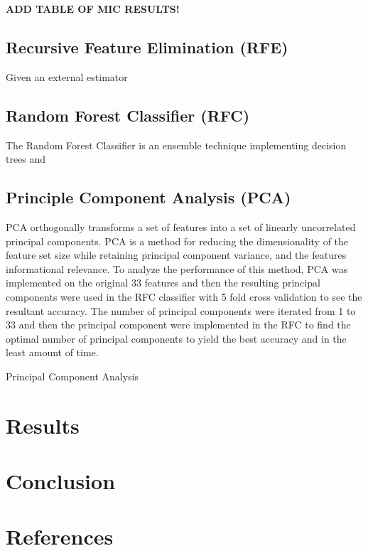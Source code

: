 \documentclass{article}
\begin{document}
\textbf{\color{red}ADD TABLE OF MIC RESULTS!}

\subsection{\color{red}Recursive Feature Elimination (RFE)}
Given an external estimator 


\subsection{\color{red}Random Forest Classifier (RFC)}
The Random Forest Classifier is an ensemble technique implementing decision trees and 


\subsection{\color{red}Principle Component Analysis (PCA)}
PCA orthogonally transforms a set of features into a set of linearly uncorrelated principal components. PCA is a method for reducing the dimensionality of the feature set size while retaining principal component variance, and the features informational relevance. To analyze the performance of this method, PCA was implemented on the original 33 features and then the resulting principal components were used in the RFC classifier with 5 fold cross validation to see the resultant accuracy. The number of principal components were iterated from 1 to 33 and then the principal component were implemented in the RFC to find the optimal number of principal components to yield the best accuracy and in the least amount of time.  

\begin{table}[h]
	\centering
	\caption{Principal Component Analysis}
	\label{tab:pca}
\end{table}


\section{Results}
\section{Conclusion}

\section*{References}
\end{document}
